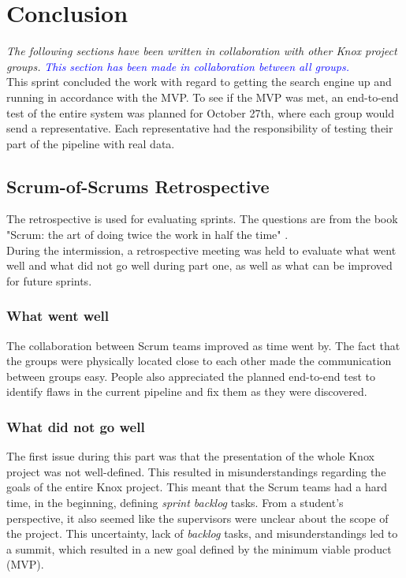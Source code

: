 \section{Conclusion}\label{scrumofscrumsConclusion}
\textit{The following sections have been written in collaboration with other Knox project groups.}
\textcolor{blue}{\textit{This section has been made in collaboration between all groups.}} \\

\noindent This sprint concluded the work with regard to getting the search engine up and running in accordance with the MVP. To see if the MVP was met, an end-to-end test of the entire system was planned for October 27th, where each group would send a representative. Each representative had the responsibility of testing their part of the pipeline with real data. 

\subsection{Scrum-of-Scrums Retrospective}\label{scrumofscrumRetrospective}
The retrospective is used for evaluating sprints. The questions are from the book "Scrum: the art of doing twice the work in half the time" \cite[p. 238]{sutherland2014scrum}.\\
\noindent During the intermission, a retrospective meeting was held to evaluate what went well and what did not go well during part one, as well as what can be improved for future sprints. 

\subsubsection{What went well}
The collaboration between Scrum teams improved as time went by. The fact that the groups were physically located close to each other made the communication between groups easy. People also appreciated the planned end-to-end test to identify flaws in the current pipeline and fix them as they were discovered.

\subsubsection{What did not go well}
The first issue during this part was that the presentation of the whole Knox project was not well-defined. This resulted in misunderstandings regarding the goals of the entire Knox project. This meant that the Scrum teams had a hard time, in the beginning, defining \textit{sprint backlog} tasks. From a student's perspective, it also seemed like the supervisors were unclear about the scope of the project. This uncertainty, lack of \textit{backlog} tasks, and misunderstandings led to a summit, which resulted in a new goal defined by the minimum viable product (MVP).\\

